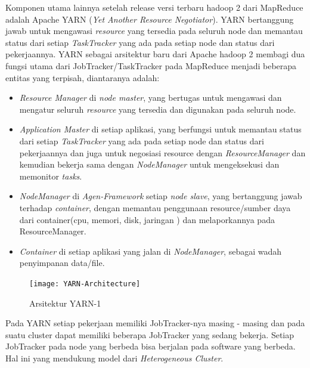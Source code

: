 		Komponen utama lainnya setelah release versi terbaru hadoop 2 dari MapReduce adalah Apache YARN (\textit{Yet Another Resource Negotiator}). YARN bertanggung jawab untuk mengawasi \textit{resource} yang tersedia pada seluruh node dan memantau status dari setiap \textit{TaskTracker} yang ada pada setiap node dan status dari pekerjaannya. YARN sebagai arsitektur baru dari Apache hadoop 2 membagi dua fungsi utama dari JobTracker/TaskTracker pada MapReduce menjadi beberapa entitas yang terpisah, diantaranya adalah: 
		\begin{itemize}
			\item \textit{Resource Manager} di \textit{node master}, yang bertugas untuk mengawasi dan mengatur seluruh \textit{resource} yang tersedia dan digunakan pada seluruh node.
			\item \textit{Application Master} di setiap aplikasi, yang berfungsi untuk memantau status dari setiap \textit{TaskTracker} yang ada pada setiap node dan status dari pekerjaannya dan juga untuk negosiasi resource dengan \textit{ResourceManager} dan kemudian bekerja sama dengan \textit{NodeManager} untuk mengeksekusi dan memonitor \textit{tasks}.
			\item \textit{NodeManager} di \textit{Agen-Framework} setiap \textit{node slave}, yang bertanggung jawab terhadap \textit{container}, dengan memantau penggunaan resource/sumber daya dari container(cpu, memori, disk, jaringan ) dan melaporkannya pada ResourceManager.
			\item \textit{Container} di setiap aplikasi yang jalan di \textit{NodeManager}, sebagai wadah penyimpanan data/file.
		\end{itemize}
		
\begin{figure}[H]
\centering
\texttt{[image: YARN-Architecture]}
\caption[Arsitektur YARN-1]{Arsitektur YARN-1}
\label{fig:Arsitektur YARN-1}
\end{figure}
		
Pada YARN setiap pekerjaan memiliki JobTracker-nya masing - masing dan pada suatu cluster dapat memiliki beberapa JobTracker yang sedang bekerja. Setiap JobTracker pada node yang berbeda bisa berjalan pada software yang berbeda. Hal ini yang mendukung model  dari \textit{Heterogeneous Cluster}.


